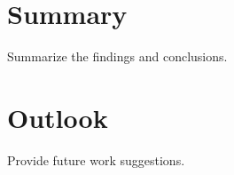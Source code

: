 \section{Summary}
Summarize the findings and conclusions.

\section{Outlook}
Provide future work suggestions.